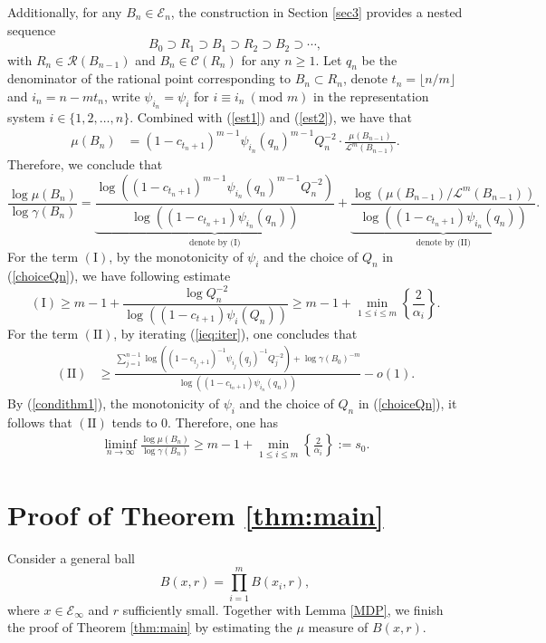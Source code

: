 \documentclass[11pt]{amsart}
\numberwithin{equation}{section}
\newcommand{\0}{\mathbf{0}}
\theoremstyle{remark}
\begin{document}
{Additionally, for any $B_n\in\mathcal{E}_n$, the construction in Section \ref{sec3} provides a nested sequence
$$B_0\supset R_1\supset B_1\supset R_2\supset B_2\supset\cdots,$$
with $R_n\in\mathcal{R}(B_{n-1})$ and $B_n\in\mathcal{C}(R_n)$ for any $n\ge 1$. Let $q_n$ be the denominator of the rational point corresponding to $B_n\subset R_n$, denote $t_n=\lfloor n/m\rfloor$ and $i_n=n-mt_n$, write $\psi_{i_n}=\psi_i$ for $i\equiv i_n \ (\text{mod } m)$ in the representation system $i\in \{1,2,\ldots,n\}$. Combined with (\ref{est1}) and (\ref{est2}), we have that
\begin{align}\label{ieq:iter}
\mu(B_n)&=(1-c_{t_n+1})^{m-1}\psi_{i_n}(q_n)^{m-1}Q_n^{-2}\cdot\frac{\mu(B_{n-1})}{\mathcal{L}^m(B_{n-1})}.
\end{align}
Therefore,  we conclude that
$$\frac{\log\mu(B_{n})}{\log \gamma(B_{n})}=\underbrace{\frac{\log ((1-c_{t_n+1})^{m-1}\psi_{i_n}(q_n)^{m-1}Q_n^{-2})}{\log((1-c_{t_n+1})\psi_{i_n}(q_n))}}_{\text{denote by (I)}}+\underbrace{\frac{\log (\mu(B_{n-1})/\mathcal{L}^m(B_{n-1}))}{\log((1-c_{t_n+1})\psi_{i_n}(q_n))}}_{\text{denote by (II)}}.$$
For the term $(\text{I})$, by the monotonicity of $\psi_i$ and the choice of $Q_n$ in (\ref{choiceQn}), we have following estimate
   $$ (\text{I})\ge m-1+\frac{\log Q_n^{-2}}{\log( (1-c_{t+1})\psi_i(Q_n))}\ge m-1+\min_{1\le i\le m}\left\{\frac{2}{\alpha_i}\right\}.$$
For the term $(\text{II})$, by iterating (\ref{ieq:iter}), one concludes that
\begin{align*}
    (\text{II})&\ge \frac{\sum_{j=1}^{n-1}\log ((1-c_{t_j+1})^{-1}\psi_{i_j}(q_j)^{-1}Q_j^{-2})+\log {\gamma(B_0)^{-m}}}{\log((1-c_{t_n+1})\psi_{i_n}(q_n))}-o(1).
\end{align*}
By (\ref{condithm1}), the monotonicity of $\psi_i$ and the choice of $Q_n$ in (\ref{choiceQn}), it follows that $(\text{II})$ tends to $0$. Therefore, one has
\begin{align}\label{result_special}
    \liminf_{n\rightarrow\infty}\frac{\log\mu(B_{n})}{\log \gamma(B_{n})}\ge m-1+\min_{1\le i\le m}\left\{\frac{2}{\alpha_i}\right\}:=s_0.
\end{align}

\section{Proof of Theorem \ref{thm:main}}\label{sec:proof}
Consider a general ball $$B(x,r)=\prod_{i=1}^{m}B(x_i,r),$$ where $x\in\mathcal{E}_{\infty}$ and $r$ sufficiently small. Together with Lemma \ref{MDP}, we finish the proof of Theorem \ref{thm:main} by estimating the $\mu$ measure of $B(x,r)$.

}
\end{document}
